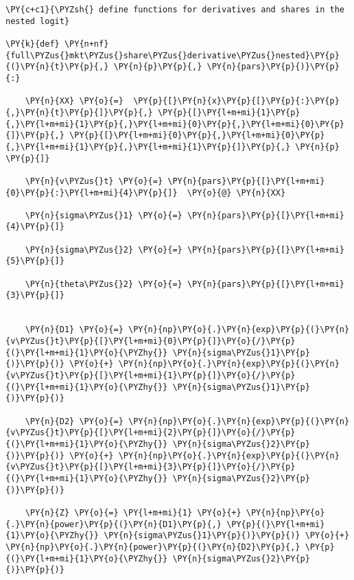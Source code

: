     \begin{tcolorbox}[breakable, size=fbox, boxrule=1pt, pad at break*=1mm,colback=cellbackground, colframe=cellborder]
\begin{Verbatim}[commandchars=\\\{\}]
\PY{c+c1}{\PYZsh{} define functions for derivatives and shares in the nested logit}

\PY{k}{def} \PY{n+nf}{full\PYZus{}mkt\PYZus{}share\PYZus{}derivative\PYZus{}nested}\PY{p}{(}\PY{n}{t}\PY{p}{,} \PY{n}{p}\PY{p}{,} \PY{n}{pars}\PY{p}{)}\PY{p}{:}

    \PY{n}{XX} \PY{o}{=}  \PY{p}{[}\PY{n}{x}\PY{p}{[}\PY{p}{:}\PY{p}{,}\PY{n}{t}\PY{p}{]}\PY{p}{,} \PY{p}{[}\PY{l+m+mi}{1}\PY{p}{,}\PY{l+m+mi}{1}\PY{p}{,}\PY{l+m+mi}{0}\PY{p}{,}\PY{l+m+mi}{0}\PY{p}{]}\PY{p}{,} \PY{p}{[}\PY{l+m+mi}{0}\PY{p}{,}\PY{l+m+mi}{0}\PY{p}{,}\PY{l+m+mi}{1}\PY{p}{,}\PY{l+m+mi}{1}\PY{p}{]}\PY{p}{,} \PY{n}{p}  \PY{p}{]}

    \PY{n}{v\PYZus{}t} \PY{o}{=} \PY{n}{pars}\PY{p}{[}\PY{l+m+mi}{0}\PY{p}{:}\PY{l+m+mi}{4}\PY{p}{]}  \PY{o}{@} \PY{n}{XX}

    \PY{n}{sigma\PYZus{}1} \PY{o}{=} \PY{n}{pars}\PY{p}{[}\PY{l+m+mi}{4}\PY{p}{]}

    \PY{n}{sigma\PYZus{}2} \PY{o}{=} \PY{n}{pars}\PY{p}{[}\PY{l+m+mi}{5}\PY{p}{]}

    \PY{n}{theta\PYZus{}2} \PY{o}{=} \PY{n}{pars}\PY{p}{[}\PY{l+m+mi}{3}\PY{p}{]}


    \PY{n}{D1} \PY{o}{=} \PY{n}{np}\PY{o}{.}\PY{n}{exp}\PY{p}{(}\PY{n}{v\PYZus{}t}\PY{p}{[}\PY{l+m+mi}{0}\PY{p}{]}\PY{o}{/}\PY{p}{(}\PY{l+m+mi}{1}\PY{o}{\PYZhy{}} \PY{n}{sigma\PYZus{}1}\PY{p}{)}\PY{p}{)} \PY{o}{+} \PY{n}{np}\PY{o}{.}\PY{n}{exp}\PY{p}{(}\PY{n}{v\PYZus{}t}\PY{p}{[}\PY{l+m+mi}{1}\PY{p}{]}\PY{o}{/}\PY{p}{(}\PY{l+m+mi}{1}\PY{o}{\PYZhy{}} \PY{n}{sigma\PYZus{}1}\PY{p}{)}\PY{p}{)}

    \PY{n}{D2} \PY{o}{=} \PY{n}{np}\PY{o}{.}\PY{n}{exp}\PY{p}{(}\PY{n}{v\PYZus{}t}\PY{p}{[}\PY{l+m+mi}{2}\PY{p}{]}\PY{o}{/}\PY{p}{(}\PY{l+m+mi}{1}\PY{o}{\PYZhy{}} \PY{n}{sigma\PYZus{}2}\PY{p}{)}\PY{p}{)} \PY{o}{+} \PY{n}{np}\PY{o}{.}\PY{n}{exp}\PY{p}{(}\PY{n}{v\PYZus{}t}\PY{p}{[}\PY{l+m+mi}{3}\PY{p}{]}\PY{o}{/}\PY{p}{(}\PY{l+m+mi}{1}\PY{o}{\PYZhy{}} \PY{n}{sigma\PYZus{}2}\PY{p}{)}\PY{p}{)}

    \PY{n}{Z} \PY{o}{=} \PY{l+m+mi}{1} \PY{o}{+} \PY{n}{np}\PY{o}{.}\PY{n}{power}\PY{p}{(}\PY{n}{D1}\PY{p}{,} \PY{p}{(}\PY{l+m+mi}{1}\PY{o}{\PYZhy{}} \PY{n}{sigma\PYZus{}1}\PY{p}{)}\PY{p}{)} \PY{o}{+} \PY{n}{np}\PY{o}{.}\PY{n}{power}\PY{p}{(}\PY{n}{D2}\PY{p}{,} \PY{p}{(}\PY{l+m+mi}{1}\PY{o}{\PYZhy{}} \PY{n}{sigma\PYZus{}2}\PY{p}{)}\PY{p}{)}



\end{Verbatim}
\end{tcolorbox}
